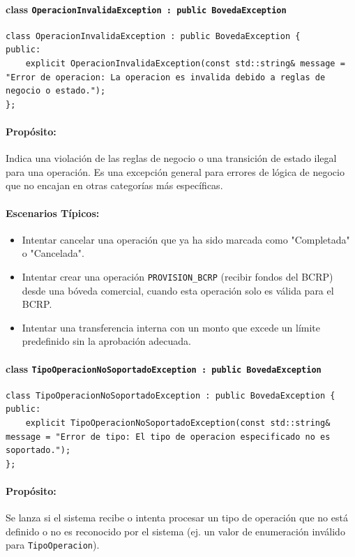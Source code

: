 \documentclass{article}
\newcommand{\inlinecode}[1]{\texttt{#1}}
\begin{document}
\paragraph*{\textbf{class \inlinecode{OperacionInvalidaException : public BovedaException}}}
\begin{lstlisting}
class OperacionInvalidaException : public BovedaException {
public:
    explicit OperacionInvalidaException(const std::string& message = "Error de operacion: La operacion es invalida debido a reglas de negocio o estado.");
};
\end{lstlisting}
\paragraph*{Propósito:} Indica una violación de las reglas de negocio o una transición de estado ilegal para una operación. Es una excepción general para errores de lógica de negocio que no encajan en otras categorías más específicas.

\paragraph*{Escenarios Típicos:}
\begin{itemize}
    \item Intentar cancelar una operación que ya ha sido marcada como "Completada" o "Cancelada".
    \item Intentar crear una operación \inlinecode{PROVISION\_BCRP} (recibir fondos del BCRP) desde una bóveda comercial, cuando esta operación solo es válida para el BCRP.
    \item Intentar una transferencia interna con un monto que excede un límite predefinido sin la aprobación adecuada.
\end{itemize}

\paragraph*{\textbf{class \inlinecode{TipoOperacionNoSoportadoException : public BovedaException}}}
\begin{lstlisting}
class TipoOperacionNoSoportadoException : public BovedaException {
public:
    explicit TipoOperacionNoSoportadoException(const std::string& message = "Error de tipo: El tipo de operacion especificado no es soportado.");
};
\end{lstlisting}
\paragraph*{Propósito:} Se lanza si el sistema recibe o intenta procesar un tipo de operación que no está definido o no es reconocido por el sistema (ej. un valor de enumeración inválido para \inlinecode{TipoOperacion}).
\end{document}
